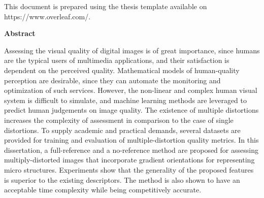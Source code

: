   
  
%  
%
\cleardoublepage

  \noindent
This document is prepared using the thesis template available on https://www.overleaf.com/.

\cleardoublepage


\begin{center}\textbf{Abstract}\end{center}

Assessing the visual quality of digital images is of great importance, since humans are the typical users of multimedia applications, and their satisfaction is dependent on the perceived quality. Mathematical models of human-quality perception are desirable, since they can automate the monitoring and optimization of such services. However, the non-linear and complex human visual system is difficult to simulate, and machine learning methods are leveraged to predict human judgements on image quality. The existence of multiple distortions increases the complexity of assessment in comparison to the case of single distortions. To supply academic and practical demands, several datasets are provided for training and evaluation of multiple-distortion quality metrics. In this dissertation, a full-reference and a no-reference method are proposed for assessing multiply-distorted images that incorporate gradient orientations for representing micro structures. Experiments show that the generality of the proposed features is superior to the existing descriptors. The method is also shown to have an acceptable time complexity while being competitively accurate.

